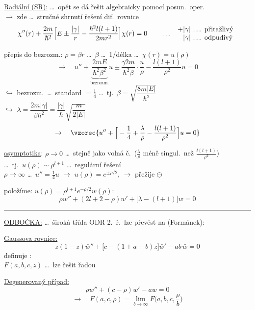 \underline{Radiální (SR):} \quad \dots\ opět se dá řešit algebraicky pomocí posun.\ oper. \\
\hspace*{2.5cm} $\to$ zde \dots\ stručné shrnutí řešení dif.\ rovnice
\[
  \chi''(r) + \frac{2m}{\hbar^2}\Big[E \pm \frac{|\gamma|}{r} - \frac{\hbar^2 l(l+1)}{2mr^2}\Big]\chi(r) = 0
  \qquad\dots\ \begin{tabular}{l} $+|\gamma|$ \dots\ přitažlivý \\ $-|\gamma|$ \dots\ odpudivý\end{tabular}
\]

přepis do bezrozm.: \quad $\rho = \beta r$ \dots\ $\beta$ \dots\ 1/délka \quad \dots\ $\chi(r) = u(\rho)$
\[
  \to\quad u'' + \underbrace{\boxed{\frac{2mE}{\hbar^2\beta^2}}}_{\text{bezrozm.}}u \pm \boxed{\frac{\gamma 2m}{\hbar^2\beta}}\cdot\frac{u}{\rho} - \frac{l(l+1)}{\rho^2}u = 0
\]
\quad $\hookrightarrow$ bezrozm.\ \dots\ standard $= \frac14$ \dots\ tj.\ $\beta = \sqrt{\dfrac{8m|E|}{\hbar^2}}$ \\
\quad\quad $\hookrightarrow$ \quad $\lambda = \dfrac{2m|\gamma|}{\beta\hbar^2} = \dfrac{|\gamma|}{\hbar}\sqrt{\dfrac{m}{2|E|}}$
\[
  \to\quad \vzorec{u'' + \Big[-\frac14 + \frac\lambda\rho - \frac{l(l+1)}{\rho^2}\Big]u = 0}
\]
\hspace*{3cm} \quad {}

\underline{asymptotika}: \quad $\rho\to 0$ \dots\ stejně jako volná č.\ ($\frac\lambda\rho$ méně singul.\ než $\frac{l(l+1)}{\rho^2}$) \\
\hspace*{3cm} \dots\ tj.\ $u(\rho)\sim\rho^{l+1}$ \dots\ regulární řešení \\
$\rho\to\infty$ \quad \dots\ $u'' = \frac14u$ \quad $\to$ \quad $u(\rho) = e^{\pm\rho/2}$, \quad $\to$ přežije $\ominus$

\underline{položíme}: \quad $u(\rho) = \rho^{l+1}e^{-\rho/2}w(\rho)$:
\[
  \rho w'' + (2l + 2 - \rho)w' + \big[\lambda - (l+1)\big]w = 0
\]
\rule{\linewidth}{0.3pt}

\begin{minipage}[t]{0.55\textwidth}
\underline{ODBOČKA:} \dots\ široká třída ODR 2.\ ř.\ lze převést na (Formánek):

\underline{Gaussova rovnice:}
\[ z(1-z)\bar w'' + \big[c - (1+a+b)z\big]\bar w' - ab\,\bar w = 0 \]
definuje : \\
\quad $F(a,b,c,z)$ \dots\ lze řešit řadou
\end{minipage}
\vrule\hspace{6pt}
\begin{minipage}[t]{0.42\textwidth}
\underline{Degenerovaný případ:}
\[ \rho w'' + (c - \rho)w' - aw = 0 \]
\[ \to\quad F(a,c,\rho) = \lim_{b\to\infty}F\Big(a,b,c,\frac\rho b\Big) \]
\end{minipage}

